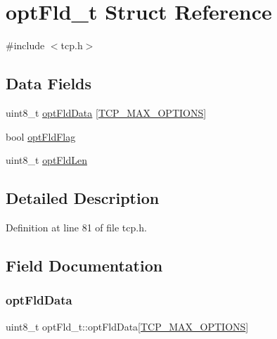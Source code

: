 \hypertarget{structoptFld__t}{}\section{opt\+Fld\+\_\+t Struct Reference}
\label{structoptFld__t}


{\ttfamily \#include $<$tcp.\+h$>$}

\subsection*{Data Fields}
\begin{DoxyCompactItemize}
\item 
uint8\+\_\+t \hyperlink{structoptFld__t_ab6302c029f258616fa73177eab1e6d5f}{opt\+Fld\+Data} \mbox{[}\hyperlink{tcp_8h_a8bf009969d6e57752fbdf77b32f2f461}{T\+C\+P\+\_\+\+M\+A\+X\+\_\+\+O\+P\+T\+I\+O\+NS}\mbox{]}
\item 
bool \hyperlink{structoptFld__t_ac73a04aef59f8fa1e56dfa7120edda44}{opt\+Fld\+Flag}
\item 
uint8\+\_\+t \hyperlink{structoptFld__t_a910e4d371530c9c598bfae3e9fcdac3f}{opt\+Fld\+Len}
\end{DoxyCompactItemize}


\subsection{Detailed Description}


Definition at line 81 of file tcp.\+h.



\subsection{Field Documentation}
\mbox{\label{structoptFld__t_ab6302c029f258616fa73177eab1e6d5f}} 
\subsubsection{\texorpdfstring{opt\+Fld\+Data}{optFldData}}
{\footnotesize\ttfamily uint8\+\_\+t opt\+Fld\+\_\+t\+::opt\+Fld\+Data\mbox{[}\hyperlink{tcp_8h_a8bf009969d6e57752fbdf77b32f2f461}{T\+C\+P\+\_\+\+M\+A\+X\+\_\+\+O\+P\+T\+I\+O\+NS}\mbox{]}}



